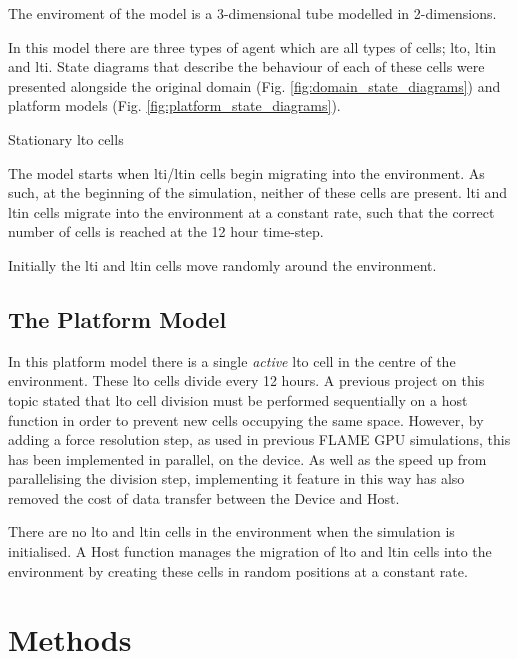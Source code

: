 \documentclass{UoYCSproject}
\begin{document}
The enviroment of the model is a 3-dimensional tube modelled in 2-dimensions.

In this model there are three types of agent which are all types of cells; \gls{lto}, \gls{ltin} and \gls{lti}.
State diagrams that describe the behaviour of each of these cells were presented alongside the original domain (Fig. \ref{fig:domain_state_diagrams}) and platform models (Fig. \ref{fig:platform_state_diagrams})\cite{kieran_thesis}.

Stationary \gls{lto} cells 

The model starts when \gls{lti}/\gls{ltin} cells begin migrating into the environment.
As such, at the beginning of the simulation, neither of these cells are present.
\gls{lti} and \gls{ltin} cells migrate into the environment at a constant rate, such that the correct number of cells is reached at the 12 hour time-step.

Initially the \gls{lti} and \gls{ltin} cells move randomly around the environment.


\section{The Platform Model}
In this platform model there is a single \textit{active} \gls{lto} cell in the centre of the environment.
These \gls{lto} cells divide every 12 hours.
A previous project on this topic stated that \gls{lto} cell division must be performed sequentially on a host function in order to prevent new cells occupying the same space\cite{phil_diss}.
However, by adding a force resolution step, as used in previous \gls{FLAME GPU} simulations\cite{flame_keratinocyte}, this has been implemented in parallel, on the device.
As well as the speed up from parallelising the division step, implementing it feature in this way has also removed the cost of data transfer between the \gls{Device} and \gls{Host}.

There are no \gls{lto} and \gls{ltin} cells in the environment when the simulation is initialised.
A \gls{Host} function manages the migration of \gls{lto} and \gls{ltin} cells into the environment by creating these cells in random positions at a constant rate.

\chapter{Methods}
\label{methods}
\end{document}
